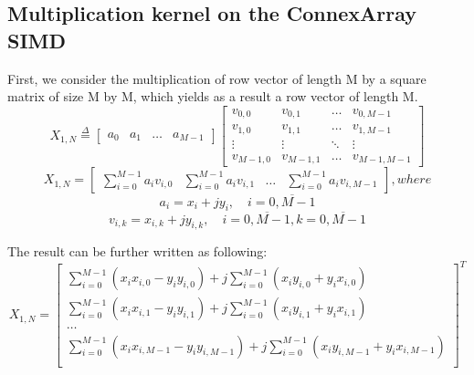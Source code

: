 \subsection{Multiplication kernel on the ConnexArray SIMD}
First, we consider the multiplication of row vector of length M by a square matrix
of size M by M, which yields as a result a row vector of length M.
\begin{equation}
    X_{1,N}
    \overset{\Delta}{=}
    \begin{bmatrix}
        a_0   &   a_1   &   \hdots   &   a_{M-1}
    \end{bmatrix}
    \begin{bmatrix}
        v_{0,0}   &   v_{0,1}   &   \hdots   &   v_{0,M-1} \\
        v_{1,0}   &   v_{1,1}   &   \hdots   &   v_{1,M-1} \\
        \vdots    &   \vdots    &   \ddots   &   \vdots    \\
        v_{M-1,0} &   v_{M-1,1} &   \hdots   &   v_{M-1,M-1}
    \end{bmatrix}
\end{equation}
\begin{equation}
    X_{1,N}
    =
    \begin{bmatrix}
        \displaystyle{\sum_{i=0}^{M-1} a_iv_{i,0}} & 
        \displaystyle{\sum_{i=0}^{M-1} a_iv_{i,1}} & 
        \hdots &
        \displaystyle{\sum_{i=0}^{M-1} a_iv_{i,M-1}}
    \end{bmatrix}
    , where
\end{equation}
\begin{equation}
a_i = x_i + jy_i, \quad i = \overline{0, M-1}
\end{equation}
\begin{equation}
v_{i,k} = x_{i,k} + jy_{i,k}, \quad i = \overline{0, M-1}, k = \overline{0, M-1}
\end{equation}

The result can be further written as following:
\begin{equation}
X_{1,N}
=
\begin{bmatrix}
  \displaystyle{\sum_{i=0}^{M-1} (x_ix_{i,0} - y_iy_{i,0}) + 
               j\sum_{i=0}^{M-1} (x_iy_{i,0} + y_ix_{i,0})} \\ 
  \displaystyle{\sum_{i=0}^{M-1} (x_ix_{i,1} - y_iy_{i,1}) + 
               j\sum_{i=0}^{M-1} (x_iy_{i,1} + y_ix_{i,1})} \\
  \hdots \\
  \displaystyle{\sum_{i=0}^{M-1} (x_ix_{i,M-1} - y_iy_{i,M-1}) + 
               j\sum_{i=0}^{M-1} (x_iy_{i,M-1} + y_ix_{i,M-1})} \\ 
\end{bmatrix}^T
\end{equation} \\

